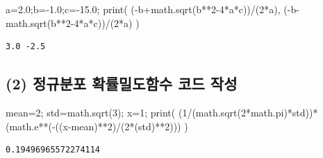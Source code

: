 \documentclass[
  a4paper,
  DIV=11,
  numbers=noendperiod]{scrreprt}
\newenvironment{Shaded}{\begin{snugshade}}{\end{snugshade}}
\newcommand{\BuiltInTok}[1]{\textcolor[rgb]{0.00,0.23,0.31}{#1}}
\newcommand{\DecValTok}[1]{\textcolor[rgb]{0.68,0.00,0.00}{#1}}
\newcommand{\FloatTok}[1]{\textcolor[rgb]{0.68,0.00,0.00}{#1}}
\newcommand{\NormalTok}[1]{\textcolor[rgb]{0.00,0.23,0.31}{#1}}
\newcommand{\OperatorTok}[1]{\textcolor[rgb]{0.37,0.37,0.37}{#1}}
\begin{document}
\begin{Shaded}
\begin{Highlighting}[]
\NormalTok{a}\OperatorTok{=}\FloatTok{2.0}\OperatorTok{;}\NormalTok{b}\OperatorTok{={-}}\FloatTok{1.0}\OperatorTok{;}\NormalTok{c}\OperatorTok{={-}}\FloatTok{15.0}\OperatorTok{;}
\BuiltInTok{print}\NormalTok{(}
\NormalTok{    (}\OperatorTok{{-}}\NormalTok{b}\OperatorTok{+}\NormalTok{math.sqrt(b}\OperatorTok{**}\DecValTok{2}\OperatorTok{{-}}\DecValTok{4}\OperatorTok{*}\NormalTok{a}\OperatorTok{*}\NormalTok{c))}\OperatorTok{/}\NormalTok{(}\DecValTok{2}\OperatorTok{*}\NormalTok{a),}
\NormalTok{    (}\OperatorTok{{-}}\NormalTok{b}\OperatorTok{{-}}\NormalTok{math.sqrt(b}\OperatorTok{**}\DecValTok{2}\OperatorTok{{-}}\DecValTok{4}\OperatorTok{*}\NormalTok{a}\OperatorTok{*}\NormalTok{c))}\OperatorTok{/}\NormalTok{(}\DecValTok{2}\OperatorTok{*}\NormalTok{a)}
\NormalTok{)}
\end{Highlighting}
\end{Shaded}

\begin{verbatim}
3.0 -2.5
\end{verbatim}

\subsection*{(2) 정규분포 확률밀도함수 코드
작성}\label{uxc815uxaddcuxbd84uxd3ec-uxd655uxb960uxbc00uxb3c4uxd568uxc218-uxcf54uxb4dc-uxc791uxc131}

\begin{Shaded}
\begin{Highlighting}[]
\NormalTok{mean}\OperatorTok{=}\DecValTok{2}\OperatorTok{;}\NormalTok{ std}\OperatorTok{=}\NormalTok{math.sqrt(}\DecValTok{3}\NormalTok{)}\OperatorTok{;}\NormalTok{ x}\OperatorTok{=}\DecValTok{1}\OperatorTok{;}
\BuiltInTok{print}\NormalTok{(}
\NormalTok{    (}\DecValTok{1}\OperatorTok{/}\NormalTok{(math.sqrt(}\DecValTok{2}\OperatorTok{*}\NormalTok{math.pi)}\OperatorTok{*}\NormalTok{std))}\OperatorTok{*}\NormalTok{(math.e}\OperatorTok{**}\NormalTok{(}\OperatorTok{{-}}\NormalTok{((x}\OperatorTok{{-}}\NormalTok{mean)}\OperatorTok{**}\DecValTok{2}\NormalTok{)}\OperatorTok{/}\NormalTok{(}\DecValTok{2}\OperatorTok{*}\NormalTok{(std)}\OperatorTok{**}\DecValTok{2}\NormalTok{)))}
\NormalTok{)}
\end{Highlighting}
\end{Shaded}

\begin{verbatim}
0.19496965572274114
\end{verbatim}
\end{document}
